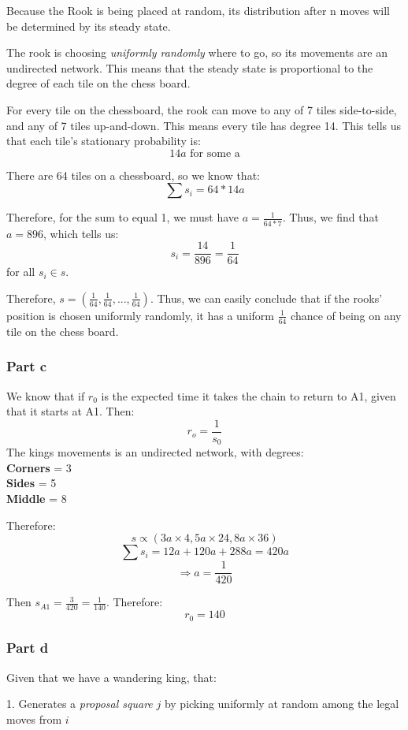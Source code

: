 \documentclass{article}
\begin{document}
Because the Rook is being placed at random, its distribution after n moves will be determined by its steady state.

The rook is choosing \textit{uniformly randomly} where to go, so its movements are an undirected network. This means that the steady state is proportional to the degree of each tile on the chess board.

For every tile on the chessboard, the rook can move to any of 7 tiles side-to-side, and any of 7 tiles up-and-down. This means every tile has degree 14. This tells us that each tile's stationary probability is:
$$14a \text{ for some a}$$

There are 64 tiles on a chessboard, so we know that:
$$\sum s_{i} = 64 * 14a$$

Therefore, for the sum to equal 1, we must have $a = \frac{1}{64 * 7}$. Thus, we find that $a = 896$, which tells us:
$$s_{i} = \frac{14}{896} = \frac{1}{64}$$
for all $s_{i} \in s$. 

Therefore, $s = (\frac{1}{64}, \frac{1}{64}, ..., \frac{1}{64})$. Thus, we can easily conclude that if the rooks' position is chosen uniformly randomly, it has a uniform $\frac{1}{64}$ chance of being on any tile on the chess board.

\subsubsection{Part c}
We know that if $r_{0}$ is the expected time it takes the chain to return to A1, given that it starts at A1. Then:
$$r_{o} = \frac{1}{s_{0}}$$
The kings movements is an undirected network, with degrees:\\
\textbf{Corners} = 3\\
\textbf{Sides} = 5\\
\textbf{Middle} = 8

Therefore:
$$s \propto (3a \times 4, 5a \times 24, 8a \times 36)$$
$$\sum s_{i} = 12a + 120a + 288a = 420a$$
$$\Rightarrow a = \frac{1}{420}$$

Then $s_{A1} = \frac{3}{420} = \frac{1}{140}$. Therefore:
$$r_{0} = 140$$

\subsubsection{Part d}
Given that we have a wandering king, that:

1. Generates a \textit{proposal square} $j$ by picking uniformly at random among the legal moves from $i$
\end{document}
